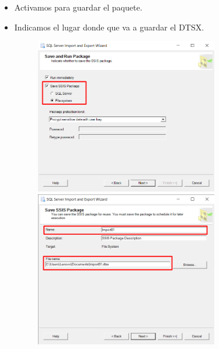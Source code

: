\documentclass[12pt,letterpaper]{article}
\begin{document}
\begin{itemize}
\item Activamos para guardar el paquete.
\item Indicamos el lugar donde que va a guardar el DTSX.
	\begin{figure}[htb]
		\begin{center}
			\includegraphics[width=8cm]{./IMAGENES/Tarea1_7}
			\includegraphics[width=8cm]{./IMAGENES/Tarea1_8}
		\end{center}
	\end{figure}




\end{itemize}
\end{document}
